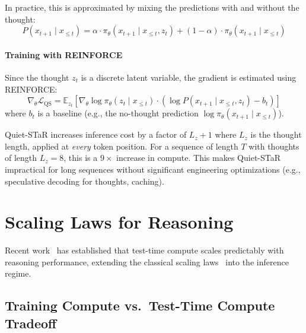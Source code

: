 In practice, this is approximated by mixing the predictions with and without the thought: 
\begin{equation}
    P(x_{t+1} \mid x_{\leq t}) = \alpha \cdot \pi_\theta(x_{t+1} \mid x_{\leq t}, z_t) + (1-\alpha) \cdot \pi_\theta(x_{t+1} \mid x_{\leq t})
\end{equation}

\paragraph{Training with REINFORCE}
\label{training-with-reinforce}

Since the thought $z_t$ is a discrete latent variable, the gradient is estimated using REINFORCE: 
\begin{equation}
    \nabla_\theta \mathcal{L}_{\text{QS}} = \mathbb{E}_{z_t} \left[ \nabla_\theta \log \pi_\theta(z_t \mid x_{\leq t}) \cdot \left( \log P(x_{t+1} \mid x_{\leq t}, z_t) - b_t \right) \right]
\end{equation}
 where $b_t$ is a baseline (e.g., the no-thought prediction $\log \pi_\theta(x_{t+1} \mid x_{\leq t})$).

\begin{warningbox}
Quiet-STaR increases inference cost by a factor of $L_z + 1$ where $L_z$ is the thought length, applied at \emph{every} token position. For a sequence of length $T$ with thoughts of length $L_z = 8$, this is a $9\times$ increase in compute. This makes Quiet-STaR impractical for long sequences without significant engineering optimizations (e.g., speculative decoding for thoughts, caching).
\end{warningbox}

\section{Scaling Laws for Reasoning}
\label{subsec:reasoning_scaling}

Recent work~\cite{snell2024scaling, wu2024empirical} has established that test-time compute scales predictably with reasoning performance, extending the classical scaling laws~\cite{kaplan2020scaling} into the inference regime.

\subsection{Training Compute vs.~Test-Time Compute Tradeoff}
\label{training-compute-vs.-test-time-compute-tradeoff}

